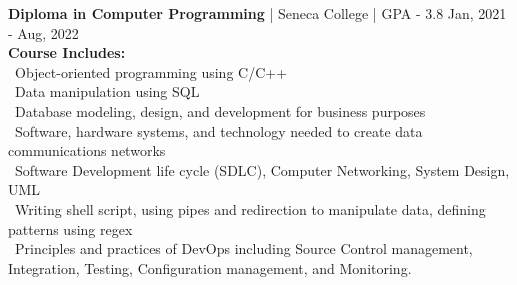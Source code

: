 {\textbf{Diploma in Computer Programming} | Seneca College | GPA - 3.8 \hfill Jan, 2021 - Aug, 2022} \\
\textbf{Course Includes: } \\
\hspace*{4pt} \textbullet~{Object-oriented programming using C/C++} \\
\hspace*{4pt} \textbullet~{Data manipulation using SQL} \\
\hspace*{4pt} \textbullet~{Database modeling, design, and development for business purposes} \\
\hspace*{4pt} \textbullet~{Software, hardware systems, and technology needed to create data communications networks} \\
\hspace*{4pt} \textbullet~{Software Development life cycle (SDLC), Computer Networking, System Design, UML} \\
\hspace*{4pt} \textbullet~{Writing shell script, using pipes and redirection to manipulate data, defining patterns using regex} \\
\hspace*{4pt} \textbullet~{Principles and practices of DevOps including Source Control management, Integration, Testing, Configuration management, and Monitoring.}
